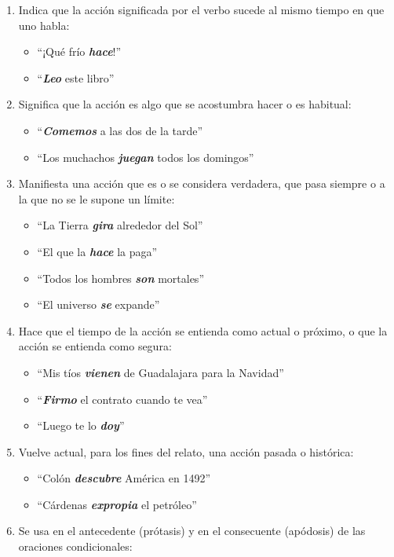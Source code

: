 \documentclass[14pt]{extarticle}
\newcommand{\marcatexto}[1]{\textbf{\textit{#1}}}
\begin{document}
\begin{enumerate}[label=\alph*)]
\item  Indica que la acción significada por el verbo sucede al mismo tiempo en que uno habla:
\begin{itemize}
\item \enquote{¡Qué frío \marcatexto{hace}!}
\item \enquote{\marcatexto{Leo} este libro}
\end{itemize}
\item Significa que la acción es algo que se acostumbra hacer o es habitual:
\begin{itemize}
\item \enquote{\marcatexto{Comemos} a las dos de la tarde}
\item \enquote{Los muchachos \marcatexto{juegan} todos los domingos}
\end{itemize}
\item Manifiesta una acción que es o se considera verdadera, que pasa siempre o a la que no se le supone un límite:
\begin{itemize}
\item \enquote{La Tierra \marcatexto{gira} alrededor del Sol}
\item \enquote{El que la \marcatexto{hace} la paga}
\item \enquote{Todos los hombres \marcatexto{son} mortales}
\item \enquote{El universo \marcatexto{se} expande}
\end{itemize}
\item Hace que el tiempo de la acción se entienda como actual o próximo, o que la acción se entienda como segura:
\begin{itemize}
\item \enquote{Mis tíos \marcatexto{vienen} de Guadalajara para la Navidad}
\item \enquote{\marcatexto{Firmo} el contrato cuando te vea}
\item \enquote{Luego te lo \marcatexto{doy}}
\end{itemize}
\item Vuelve actual, para los fines del relato, una acción pasada o histórica:
\begin{itemize}
\item \enquote{Colón \marcatexto{descubre} América en 1492}
\item \enquote{Cárdenas \marcatexto{expropia} el petróleo}
\end{itemize}
\item Se usa en el antecedente (prótasis) y en el consecuente (apódosis) de las oraciones condicionales:

\end{enumerate}
\end{document}
